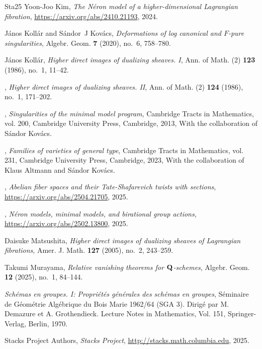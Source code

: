 \documentclass{amsart}
\theoremstyle{definition}
\theoremstyle{remark}
\begin{document}
\begin{thebibliography}{{Sta}25}
Yoon-Joo Kim, \emph{The {N\'e}ron model of a higher-dimensional {L}agrangian
  fibration}, \url{https://arxiv.org/abs/2410.21193}, 2024.

J{\'a}nos Koll{\'a}r and S{\'a}ndor~J Kov{\'a}cs, \emph{Deformations of log
  canonical and {$F$}-pure singularities}, Algebr. Geom. \textbf{7} (2020),
  no.~6, 758--780. 

J{\'a}nos Koll{\'a}r, \emph{Higher direct images of dualizing sheaves. {I}},
  Ann. of Math. (2) \textbf{123} (1986), no.~1, 11--42. 

\bysame, \emph{Higher direct images of dualizing sheaves. {II}}, Ann. of Math.
  (2) \textbf{124} (1986), no.~1, 171--202. 

\bysame, \emph{Singularities of the minimal model program}, Cambridge Tracts in
  Mathematics, vol. 200, Cambridge University Press, Cambridge, 2013, With the
  collaboration of S{\'a}ndor Kov{\'a}cs.

\bysame, \emph{Families of varieties of general type}, Cambridge Tracts in
  Mathematics, vol. 231, Cambridge University Press, Cambridge, 2023, With the
  collaboration of Klaus Altmann and S{\'a}ndor Kov{\'a}cs. 

\bysame, \emph{Abelian fiber spaces and their {T}ate-{S}hafarevich twists with
  sections}, \url{https://arxiv.org/abs/2504.21705}, 2025.

\bysame, \emph{N\'eron models, minimal models, and birational group actions},
  \url{https://arxiv.org/abs/2502.13800}, 2025.

Daisuke Matsushita, \emph{Higher direct images of dualizing sheaves of
  {L}agrangian fibrations}, Amer. J. Math. \textbf{127} (2005), no.~2,
  243--259. 

Takumi Murayama, \emph{Relative vanishing theorems for {$\bf Q$}-schemes},
  Algebr. Geom. \textbf{12} (2025), no.~1, 84--144. 

\emph{Sch\'emas en groupes. {I}: {P}ropri\'et\'es g\'en\'erales des sch\'emas
  en groupes}, S\'eminaire de G\'eom\'etrie Alg\'ebrique du Bois Marie 1962/64
  (SGA 3). Dirig\'e par M. Demazure et A. Grothendieck. Lecture Notes in
  Mathematics, Vol. 151, Springer-Verlag, Berlin, 1970. 

{Stacks Project Authors}, \emph{{S}tacks {P}roject},
  \url{http://stacks.math.columbia.edu}, 2025.

\end{thebibliography}



 \medskip
 
\end{document}
